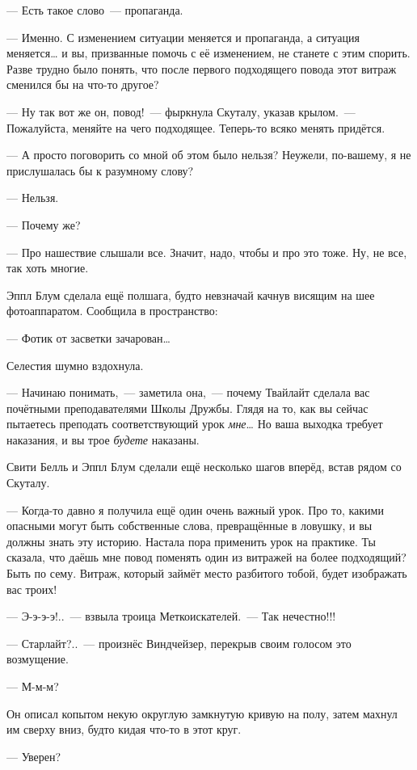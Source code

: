 \documentclass[fontsize=11pt,a5paper,titlepage=firstcover]{scrbook}
\begin{document}
--- Есть такое слово~--- пропаганда.

--- Именно. С изменением ситуации меняется и пропаганда, а ситуация меняется{\ldots} и вы, призванные помочь с её изменением, не станете с этим спорить. Разве трудно было понять, что после первого подходящего повода этот витраж сменился бы на что-то другое?

--- Ну так вот же он, повод!~--- фыркнула Скуталу, указав крылом.~--- Пожалуйста, меняйте на чего подходящее. Теперь-то всяко менять придётся.

--- А просто поговорить со мной об этом было нельзя? Неужели, по-вашему, я не прислушалась бы к разумному слову?

--- Нельзя.

--- Почему же?

--- Про нашествие слышали все. Значит, надо, чтобы и про это тоже. Ну, не все, так хоть многие.

Эппл Блум сделала ещё полшага, будто невзначай качнув висящим на шее фотоаппаратом. Сообщила в пространство:

--- Фотик от засветки зачарован{\ldots}

Селестия шумно вздохнула.

--- Начинаю понимать,~--- заметила она,~--- почему Твайлайт сделала вас почётными преподавателями Школы Дружбы. Глядя на то, как вы сейчас пытаетесь преподать соответствующий урок \emph{мне}{\ldots} Но ваша выходка требует наказания, и вы трое \emph{будете} наказаны.

Свити Белль и Эппл Блум сделали ещё несколько шагов вперёд, встав рядом со Скуталу.

--- Когда-то давно я получила ещё один очень важный урок. Про то, какими опасными могут быть собственные слова, превращённые в ловушку, и вы должны знать эту историю. Настала пора применить урок на практике. Ты сказала, что даёшь мне повод поменять один из витражей на более подходящий? Быть по сему. Витраж, который займёт место разбитого тобой, будет изображать вас троих!

--- Э-э-э-э!..~--- взвыла троица Меткоискателей.~--- Так нечестно!!!

--- Старлайт?..~--- произнёс Виндчейзер, перекрыв своим голосом это возмущение.

--- М-м-м?

Он описал копытом некую округлую замкнутую кривую на полу, затем махнул им сверху вниз, будто кидая что-то в этот круг.

--- Уверен?
\end{document}
